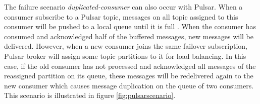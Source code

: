 The failure scenario \emph{duplicated-consumer} can also occur with Pulsar. When a consumer subscribe to a Pulsar topic, messages on all topic assigned to this consumer will be pushed to a local queue until it is full \cite{pulsarbinaryprotocol}. When the consumer has consumed and acknowledged half of the buffered messages, new messages will be delivered. However, when a new consumer joins the same failover subscription, Pulsar broker will assign some topic partitions to it for load balancing. In this case, if the old consumer has not processed and acknowledged all messages of the reassigned partition on its queue, these messages will be redelivered again to the new consumer which causes message duplication on the queue of two consumers. This scenario is illustrated in figure \ref{fig:pulsarscenario}.

